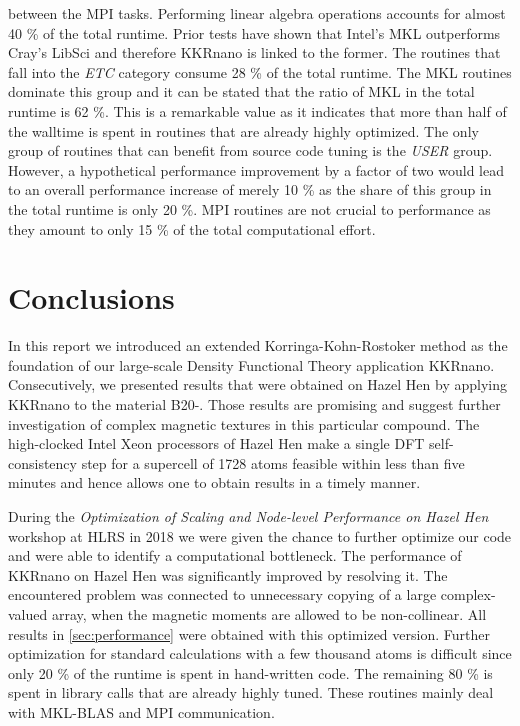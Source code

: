 \documentclass[graybox]{svmult}
\begin{document}
between the MPI tasks. 
Performing linear algebra operations accounts for almost 40 \% of the total runtime. Prior tests have shown that
Intel's MKL outperforms Cray's LibSci and therefore KKRnano is linked to the former.
The routines that fall into the \textit{ETC} category consume 28 \% of the total runtime. 
The MKL routines dominate this group and it can be stated that the ratio of MKL in the total runtime is 62 \%.
This is a remarkable value as it indicates that more than half of the walltime is spent in routines
that are already highly optimized.
The only group of routines that can benefit from source code tuning is the \textit{USER} group.
However, a hypothetical performance improvement by a factor of two would lead to
an overall performance increase of merely 10 \% as the share of this group in the total runtime is only 20 \%.
MPI routines are not crucial to performance as they amount to only 15 \% of the total
computational effort.


\section{Conclusions}
In this report we introduced an extended Korringa-Kohn-Rostoker method as the foundation of our large-scale
Density Functional Theory application KKRnano. 
Consecutively, we presented results that were obtained on Hazel Hen 
by applying KKRnano to the material B20-.
Those results are promising and suggest further investigation
of complex magnetic textures in this particular compound.
The high-clocked Intel Xeon processors of Hazel Hen
make a single DFT self-consistency step for a supercell of 1728 atoms feasible within 
less than five minutes and hence allows one
to obtain results in a timely manner.

During the
\textit{Optimization of Scaling and Node-level Performance on Hazel Hen} workshop at HLRS in 2018 we were
given the chance to further optimize our code and were able to identify a computational bottleneck. 
The performance of KKRnano on Hazel Hen was significantly improved by resolving it. The encountered problem was
connected to unnecessary copying of a large complex-valued array, when the magnetic moments are allowed to be
non-collinear.
All results in \cref{sec:performance} were
obtained with this optimized version.
Further optimization for standard calculations with a few thousand atoms 
is difficult since only 20 \% of the runtime is spent in hand-written code. The remaining 80 \% is spent in
library calls that are already highly tuned. These routines mainly deal with
MKL-BLAS and MPI communication.
\end{document}
